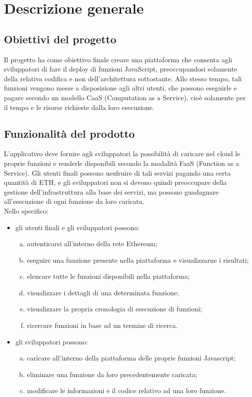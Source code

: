 \section{Descrizione generale}

\subsection{Obiettivi del progetto}
Il progetto \NomeProgetto{} ha come obiettivo finale creare una piattaforma che consenta agli sviluppatori di fare il deploy di funzioni JavaScript, preoccupandosi solamente della relativa codifica e non dell'architettura sottostante. Allo stesso tempo, tali funzioni vengono messe a disposizione agli altri utenti, che possono eseguirle e pagare secondo un modello CaaS (Computation as a Service), cioè solamente per il tempo e le risorse richieste dalla loro esecuzione.

\subsection{Funzionalità del prodotto}
L'applicativo deve fornire agli sviluppatori la possibilità di caricare nel cloud le proprie funzioni e renderle disponibili secondo la modalità FaaS (Function as a Service). Gli utenti finali possono usufruire di tali servizi pagando una certa quantità di ETH, e gli sviluppatori non si devono quindi preoccupare della gestione dell'infrastruttura alla base dei servizi, ma possono guadagnare all'esecuzione di ogni funzione da loro caricata. \\
Nello specifico:
	\begin{itemize}
		\item gli utenti finali e gli sviluppatori possono:
		\begin{enumerate}[a.]
			\item autenticarsi all'interno della rete Ethereum;
			\item eseguire una funzione presente nella piattaforma e visualizzarne i risultati;
			\item elencare tutte le funzioni disponibili nella piattaforma;
			\item visualizzare i dettagli di una determinata funzione;
			\item visualizzare la propria cronologia di esecuzione di funzioni;
			\item ricercare funzioni in base ad un termine di ricerca.
		\end{enumerate}

		\item gli sviluppatori possono:
		\begin{enumerate}[a.]
			\item caricare all'interno della piattaforma delle proprie funzioni Javascript;
			\item eliminare una funzione da loro precedentemente caricata;
			\item modificare le informazioni e il codice relativo ad una loro funzione.
		\end{enumerate}
	\end{itemize}


